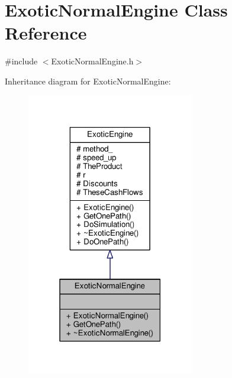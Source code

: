 \hypertarget{classExoticNormalEngine}{}\section{Exotic\+Normal\+Engine Class Reference}
\label{classExoticNormalEngine}


{\ttfamily \#include $<$Exotic\+Normal\+Engine.\+h$>$}



Inheritance diagram for Exotic\+Normal\+Engine\+:
\nopagebreak
\begin{figure}[H]
\begin{center}
\leavevmode
\includegraphics[width=207pt]{classExoticNormalEngine__inherit__graph}
\end{center}
\end{figure}


